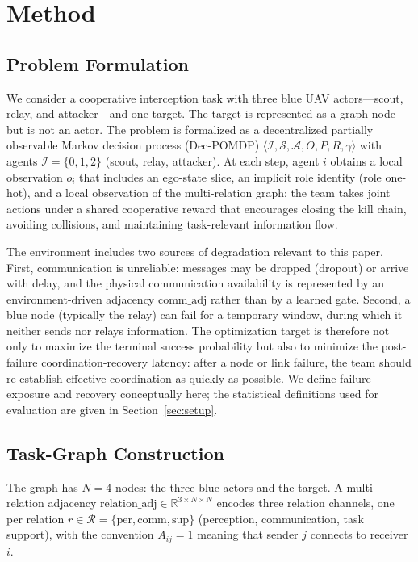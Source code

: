 \section{Method}
\label{sec:method}

\subsection{Problem Formulation}
\label{sec:problem}

We consider a cooperative interception task with three blue UAV actors---scout, relay, and attacker---and one target. The target is represented as a graph node but is not an actor. The problem is formalized as a decentralized partially observable Markov decision process (Dec-POMDP) $\langle \mathcal{I}, \mathcal{S}, \mathcal{A}, O, P, R, \gamma \rangle$ with agents $\mathcal{I}=\{0,1,2\}$ (scout, relay, attacker). At each step, agent $i$ obtains a local observation $o_i$ that includes an ego-state slice, an implicit role identity (role one-hot), and a local observation of the multi-relation graph; the team takes joint actions under a shared cooperative reward that encourages closing the kill chain, avoiding collisions, and maintaining task-relevant information flow.

The environment includes two sources of degradation relevant to this paper. First, communication is unreliable: messages may be dropped (dropout) or arrive with delay, and the physical communication availability is represented by an environment-driven adjacency $\mathrm{comm\_adj}$ rather than by a learned gate. Second, a blue node (typically the relay) can fail for a temporary window, during which it neither sends nor relays information. The optimization target is therefore not only to maximize the terminal success probability but also to minimize the post-failure coordination-recovery latency: after a node or link failure, the team should re-establish effective coordination as quickly as possible. We define failure exposure and recovery conceptually here; the statistical definitions used for evaluation are given in Section~\ref{sec:setup}.

\subsection{Task-Graph Construction}
\label{sec:task_graph}

The graph has $N=4$ nodes: the three blue actors and the target. A multi-relation adjacency $\mathrm{relation\_adj} \in \mathbb{R}^{3\times N\times N}$ encodes three relation channels, one per relation $r \in \mathcal{R}=\{\mathrm{per}, \mathrm{comm}, \mathrm{sup}\}$ (perception, communication, task support), with the convention $A_{ij}=1$ meaning that sender $j$ connects to receiver $i$.

